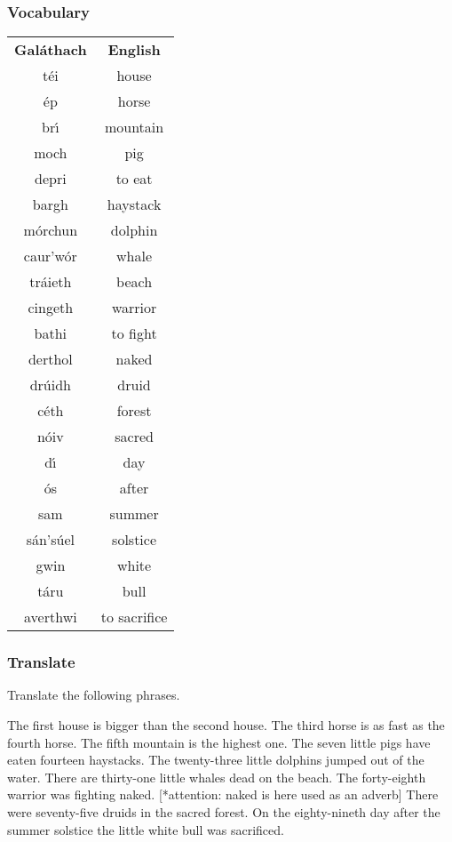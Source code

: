 \subsubsection{Vocabulary}

\begin{table}[H]
\centering
\begin{tabular}{cc}
  \toprule
  \textbf{Gal\'{a}thach} & \textbf{English}\\
  t\'{e}i & house\\
  \'{e}p & horse\\
  br\'{\i} & mountain\\
  moch & pig\\
  depri & to eat\\
  bargh & haystack\\
  m\'{o}rchun & dolphin\\
  caur'w\'{o}r & whale\\
  tr\'{a}ieth & beach\\
  cingeth & warrior\\
  bathi & to fight\\
  derthol & naked\\
  dr\'{u}idh & druid\\
  c\'{e}th & forest\\
  n\'{o}iv & sacred\\
  d\'{\i} & day\\
  \'{o}s & after\\
  sam & summer\\
  s\'{a}n's\'{u}el & solstice\\
  gwin & white\\
  t\'{a}ru & bull\\
  averthwi & to sacrifice\\
  \bottomrule
\end{tabular}
\label{vocab_exercise_lesson17}
\end{table}
 
\subsubsection{Translate}

Translate the following phrases.

The first house is bigger than the second house.
The third horse is as fast as the fourth horse.
The fifth mountain is the highest one.
The seven little pigs have eaten fourteen haystacks.
The twenty-three little dolphins jumped out of the water.
There are thirty-one little whales dead on the beach.
The forty-eighth warrior was fighting naked. [*attention: naked is here used as an adverb]
There were seventy-five druids in the sacred forest.
On the eighty-nineth day after the summer solstice the little white bull was sacrificed.

